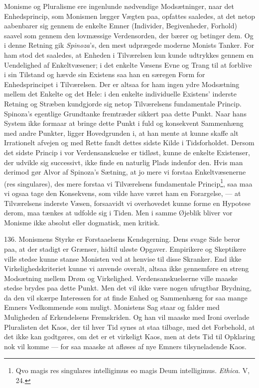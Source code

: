 \documentclass[12pt,a4paper]{book}
\newcommand{\apage}[1]{\marginnote{\footnotesize\textit{[#1]}}}
\begin{document}
Monisme og Pluralisme ere ingenlunde nødvendige Modsætninger, naar det Enhedsprincip,
som Monismen lægger Vægten paa, opfattes saaledes, at det netop aabenbarer sig gennem de
enkelte Emner (Individer, Begivenheder, Forhold) saavel som gennem den lovmæssige
Verdensorden, der bærer og betinger dem. Og i denne Retning gik \emph{Spinoza}'s, den
mest udprægede moderne Monists Tanker. For ham stod det saaledes, at Enheden i
Tilværelsen kun kunde udtrykkes gennem en Uendelighed af Enkeltvæsener; i det enkelte
Væsens Evne og Trang til at forblive i sin Tilstand og hævde sin Existens saa han en
særegen Form for Enhedsprincipet i Tilværelsen. Der er altsaa for ham ingen ydre
Modsætning mellem det Enkelte og det Hele: i den enkelte individuelle Existens' inderste
Retning og Stræben kundgjorde sig netop Tilværelsens fundamentale Princip. Spinoza's
egentlige Grundtanke fremtræder sikkert paa dette Punkt. Naar hans System ikke formaar at
bringe dette Punkt \apage{327} i fuld og konsekvent Sammenhæng med andre Punkter, ligger
Hovedgrunden i, at han mente at kunne skaffe alt Irrationelt afvejen og med Rette fandt
dettes sidste Kilde i Tidsforholdet. Dersom det sidste Princip i vor Verdensanskuelse er
tidløst, kunne de enkelte Existenser, der udvikle sig successivt, ikke finde en naturlig
Plads indenfor den. Hvis man derimod gør Alvor af Spinoza's Sætning, at jo mere vi
forstaa Enkeltvæsenerne (res singulares), des mere forstaa vi Tilværelsens fundamentale
Princip\footnote{Qvo magis res singulares intelligimus eo magis Deum intelligimus.
\emph{Ethica}. V, 24.}, saa maa vi ogsaa tage den Konsekvens, som vilde have været ham en
Forargelse, --- at Tilværelsens inderste Væsen, forsaavidt vi overhovedet kunne forme en
Hypotese derom, maa tænkes at udfolde sig i Tiden. Men i samme Øjeblik bliver vor Monisme
ikke absolut eller dogmatisk, men kritisk.

136. Monismens Styrke er Forstaaelsens Kendsgerning. Dens svage Side beror paa, at der
stadigt er Grænser, hidtil uløste Opgaver. Empirikere og Skeptikere ville stedse kunne
stanse Monisten ved at henvise til disse Skranker. End ikke Virkelighedskriteriet kunne
vi anvende overalt, altsaa ikke gennemføre en streng Modsætning mellem Drøm og
Virkelighed. Verdensanskuelserne ville maaske stedse brydes paa dette Punkt. Men det vil
ikke være nogen ufrugtbar Brydning, da den vil skærpe Interessen for at finde Enhed og
Sammenhæng for saa mange Emners Vedkommende som muligt. Monistens Sag staar og falder med
Muligheden af Erkendelsens Fremskriden. Og han vil maaske med Ironi overlade Pluralisten
det Kaos, der til hver Tid synes at staa tilbage, med det Forbehold, at det ikke kan
godtgøres, om det er et virkeligt Kaos, men at dets Tid til Opklaring nok vil komme ---
for saa maaske at afløses af nye Emners tilsyneladende Kaos.
\end{document}
